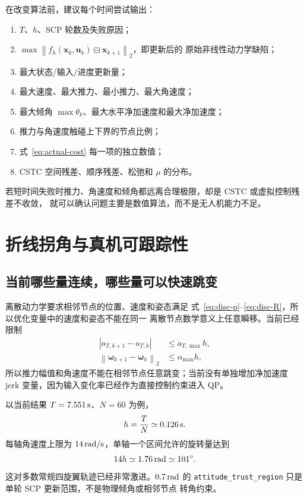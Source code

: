 \documentclass[UTF8,a4paper,11pt]{ctexart}
\newcommand{\normtwo}[1]{\left\lVert#1\right\rVert_2}
\newcommand{\code}[1]{\texttt{#1}}
\begin{document}
在改变算法前，建议每个时间尝试输出：
\begin{enumerate}
  \item $T$、$h$、SCP 轮数及失败原因；
  \item $\max\normtwo{f_h(\bm x_k,\bm u_k)\boxminus\bm x_{k+1}}$，即更新后的
  原始非线性动力学缺陷；
  \item 最大状态/输入/进度更新量；
  \item 最大速度、最大推力、最小推力、最大角速度；
  \item 最大倾角 $\max\theta_k$、最大水平净加速度和最大净加速度；
  \item 推力与角速度触碰上下界的节点比例；
  \item 式~\eqref{eq:actual-cost} 每一项的独立数值；
  \item CSTC 空间残差、顺序残差、松弛和 $\mu$ 的分布。
\end{enumerate}
若短时间失败时推力、角速度和倾角都远离合理极限，却是 CSTC 或虚拟控制残差不收敛，
就可以确认问题主要是数值算法，而不是无人机能力不足。

\section{折线拐角与真机可跟踪性}

\subsection{当前哪些量连续，哪些量可以快速跳变}

离散动力学要求相邻节点的位置、速度和姿态满足
式~\eqref{eq:disc-p}--\eqref{eq:disc-R}，所以优化变量中的速度和姿态不能在同一
离散节点数学意义上任意瞬移。当前已经限制
\begin{align}
 |a_{T,k+1}-a_{T,k}|&\leq \dot a_{T,\max}h,\\
 \normtwo{\bm\omega_{k+1}-\bm\omega_k}&\leq\alpha_{\max}h,
\end{align}
所以推力幅值和角速度不能在相邻节点任意跳变；当前没有单独增加净加速度 jerk
变量，因为输入变化率已经作为直接控制约束进入 QP。

以当前结果 $T=7.551\,{\rm s}$、$N=60$ 为例，
\begin{equation}
 h=\frac{T}{N}\simeq0.126\,{\rm s}.
\end{equation}
每轴角速度上限为 $14\,{\rm rad/s}$，单轴一个区间允许的旋转量达到
\begin{equation}
 14h\simeq1.76\,{\rm rad}\simeq101^\circ.
\end{equation}
这对多数常规四旋翼轨迹已经非常激进。$0.7\,{\rm rad}$ 的
\code{attitude\_trust\_region} 只是单轮 SCP 更新范围，不是物理倾角或相邻节点
转角约束。
\end{document}

